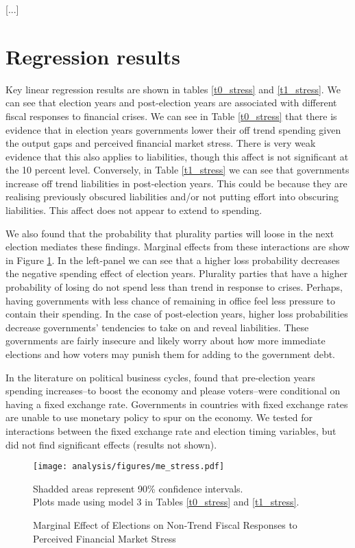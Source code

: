 \documentclass[]{article}
\begin{document}
[...]

\section{Regression results}

Key linear regression results are shown in tables \ref{t0_stress} and \ref{t1_stress}. We can see that election years and post-election years are associated with different fiscal responses to financial crises. We can see in Table \ref{t0_stress} that there is evidence that in election years governments lower their off trend spending given the output gaps and perceived financial market stress. There is very weak evidence that this also applies to liabilities, though this affect is not significant at the 10 percent level. Conversely, in Table \ref{t1_stress} we can see that governments increase off trend liabilities in post-election years. This could be because they are realising previously obscured liabilities and/or not putting effort into obscuring liabilities. This affect does not appear to extend to spending.

We also found that the probability that plurality parties will loose in the next election mediates these findings. Marginal effects from these interactions are show in Figure \ref{me_stress}. In the left-panel we can see that a higher loss probability decreases the negative spending effect of election years. Plurality parties that have a higher probability of losing do not spend less than trend in response to crises. Perhaps, having governments with less chance of remaining in office feel less pressure to contain their spending. In the case of post-election years, higher loss probabilities decrease governments' tendencies to take on and reveal liabilities. These governments are fairly insecure and likely worry about how more immediate elections and how voters may punish them for adding to the government debt.

In the literature on political business cycles, \cite{clark2000} found that pre-election years spending increases--to boost the economy and please voters--were conditional on having a fixed exchange rate. Governments in countries with fixed exchange rates are unable to use monetary policy to spur on the economy. We tested for interactions between the fixed exchange rate and election timing variables, but did not find significant effects (results not shown).


\begin{figure}
    \caption{Marginal Effect of Elections on Non-Trend Fiscal Responses to Perceived Financial Market Stress}
    \label{me_stress}

    \begin{center}
        \texttt{[image: analysis/figures/me\_stress.pdf]}
    \end{center}

    {\scriptsize{Shadded areas represent 90\% confidence intervals. \\
    Plots made using model 3 in Tables \ref{t0_stress} and \ref{t1_stress}.}}

\end{figure}
\end{document}
